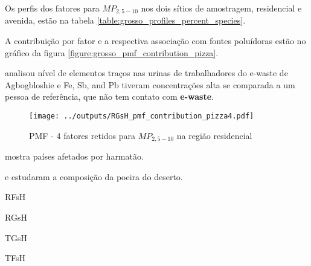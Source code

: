 Os perfis dos fatores para $MP_{2,5-10}$ nos dois sítios de amostragem, 
residencial e avenida, estão na tabela \ref{table:grosso_profiles_percent_species}.

A contribuição por fator e a respectiva associação com fontes poluídoras
estão no gráfico da figura \ref{figure:grosso_pmf_contribution_pizza}. 

\citep{asante2012} analisou nível de elementos traços nas urinas de trabalhadores 
do e-waste de Agbogbloshie e Fe, Sb, and Pb tiveram concentrações alta se comparada
a um pessoa de referência, que não tem contato com \textbf{e-waste}.

\begin{figure}[H]
\begin{center}
  \texttt{[image: ../outputs/RGsH\_pmf\_contribution\_pizza4.pdf]}
  \caption{PMF - 4 fatores retidos para $MP_{2,5-10}$ na região residencial}
\end{center}
\end{figure}

\citep{kaku2016}

\citep{prospero2002} mostra países afetados por harmatão. 

\citep{engelbrecht2009a} e \citep{engelbrecht2009b} estudaram a composição 
da poeira do deserto.


\begin{table}[H]
  \centering
  \caption{RFsH}
  
\end{table}

\begin{table}[H]
  \centering
  \caption{RGsH}
  
\end{table}

\begin{table}[H]
  \centering
  \caption{TGsH}
  
\end{table}


\begin{table}[H]
  \centering
  \caption{TFsH}
  
\end{table}

